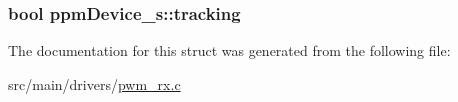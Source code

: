\hypertarget{structppmDevice__s_a49fb0737f180aab2feee8861a116293b}{
\subsubsection[{tracking}]{\setlength{\rightskip}{0pt plus 5cm}bool ppm\+Device\+\_\+s\+::tracking}}\label{structppmDevice__s_a49fb0737f180aab2feee8861a116293b}


The documentation for this struct was generated from the following file\+:\begin{DoxyCompactItemize}
\item 
src/main/drivers/\hyperlink{pwm__rx_8c}{pwm\+\_\+rx.\+c}\end{DoxyCompactItemize}
